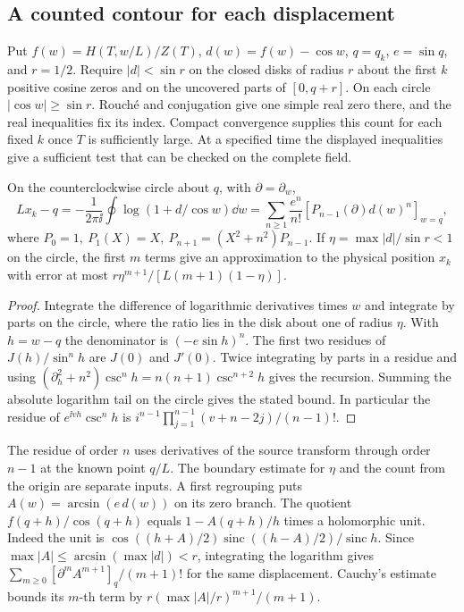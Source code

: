 \subsection{A counted contour for each displacement}
Put \(f(w)=H(T,w/L)/Z(T)\), \(d(w)=f(w)-\cos w\), \(q=q_k\), \(e=\sin q\), and \(r=1/2\). Require \(|d|<\sin r\) on the closed disks of radius \(r\) about the first \(k\) positive cosine zeros and on the uncovered parts of \([0,q+r]\). On each circle \(|\cos w|\ge\sin r\). Rouché and conjugation give one simple real zero there, and the real inequalities fix its index. Compact convergence supplies this count for each fixed \(k\) once \(T\) is sufficiently large. At a specified time the displayed inequalities give a sufficient test that can be checked on the complete field.
\begin{proposition}\label{prop:loop}
On the counterclockwise circle about \(q\), with \(\partial=\partial_w\),
\begin{equation}
 Lx_k-q=-\frac1{2\pi\ii}\oint\log(1+d/\cos w)\dd w
 =\sum_{n\ge1}\frac{e^n}{n!}\left[P_{n-1}(\partial)d(w)^n\right]_{w=q},
 \label{eq:loop}
\end{equation}
where \(P_0=1,\ P_1(X)=X,\ P_{n+1}=(X^2+n^2)P_{n-1}\). If \(\eta=\max|d|/\sin r<1\) on the circle, the first \(m\) terms give an approximation to the physical position \(x_k\) with error at most \(r\eta^{m+1}/[L(m+1)(1-\eta)]\).
\end{proposition}
\begin{proof}
Integrate the difference of logarithmic derivatives times \(w\) and integrate by parts on the circle, where the ratio lies in the disk about one of radius \(\eta\). With \(h=w-q\) the denominator is \((-e\sin h)^n\). The first two residues of \(J(h)/\sin^n h\) are \(J(0)\) and \(J'(0)\). Twice integrating by parts in a residue and using
\((\partial_h^2+n^2)\csc^n h=n(n+1)\csc^{n+2}h\)
gives the recursion. Summing the absolute logarithm tail on the circle gives the stated bound. In particular the residue of \(e^{\ii v h}\csc^n h\) is \(i^{n-1}\prod_{j=1}^{n-1}(v+n-2j)/(n-1)!\).
\end{proof}
The residue of order \(n\) uses derivatives of the source transform through order \(n-1\)
at the known point \(q/L\). The boundary estimate for \(\eta\) and the count from the
origin are separate inputs. A first regrouping puts \(A(w)=\arcsin(e\,d(w))\) on its zero branch. The quotient \(f(q+h)/\cos(q+h)\) equals \(1-A(q+h)/h\) times a holomorphic unit. Indeed the unit is \(\cos((h+A)/2)\operatorname{sinc}((h-A)/2)/\operatorname{sinc} h\). Since \(\max|A|\le\arcsin(\max|d|)<r\), integrating the logarithm gives \(\sum_{m\ge0}[\partial^m A^{m+1}]_{q}/(m+1)!\) for the same displacement. Cauchy's estimate bounds its \(m\)-th term by \(r(\max|A|/r)^{m+1}/(m+1)\).

